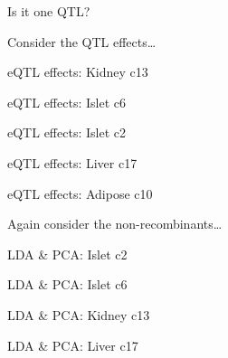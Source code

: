 \documentclass[12pt,t]{beamer}
\begin{document}
\begin{frame}[c]{}
\centerline{\Large \ticolor Is it one QTL?}
\end{frame}


\begin{frame}[c]{}
\centerline{\Large \ticolor Consider the QTL effects\dots}
\end{frame}



\begin{frame}[c]{eQTL effects: Kidney c13}
\end{frame}

\begin{frame}[c]{eQTL effects: Islet c6}
\end{frame}

\begin{frame}[c]{eQTL effects: Islet c2}
\end{frame}

\begin{frame}[c]{eQTL effects: Liver c17}
\end{frame}

\begin{frame}[c]{eQTL effects: Adipose c10}
\end{frame}



\begin{frame}[c]{}
\centerline{\Large \ticolor Again consider the non-recombinants\dots}
\end{frame}


\begin{frame}[c]{LDA \& PCA: Islet c2}
\end{frame}

\begin{frame}[c]{LDA \& PCA: Islet c6}
\end{frame}

\begin{frame}[c]{LDA \& PCA: Kidney c13}
\end{frame}

\begin{frame}[c]{LDA \& PCA: Liver c17}
\end{frame}
\end{document}
